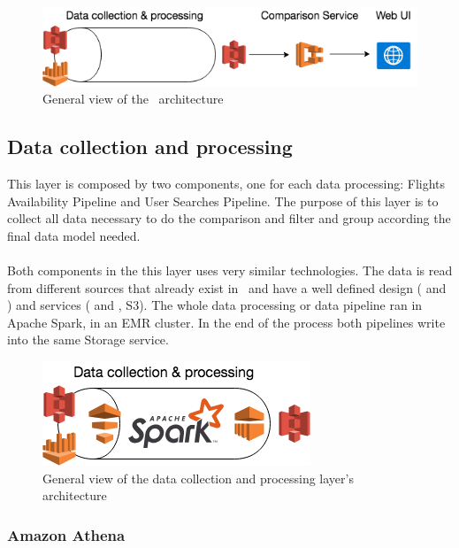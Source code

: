 \begin{figure}[H]
\centering
\includegraphics[scale=0.7]{diagrams/architecture01.png}
\caption{General view of the \thesis\ architecture}
\end{figure}

\subsection{Data collection and processing}

This layer is composed by two components, one for each data processing: Flights Availability Pipeline and User Searches Pipeline. The purpose of this layer is to collect all data necessary to do the comparison and filter and group according the final data model needed.
\\\\
Both components in the this layer uses very similar technologies. The data is read from different sources that already exist in \company\ and have a well defined design ( and ) and services ( and , S3). The whole data processing or data pipeline ran in Apache Spark, in an EMR cluster. In the end of the process both pipelines write into the same Storage service.

\begin{figure}[H]
\centering
\includegraphics[scale=0.7]{diagrams/architecture-data.png}
\caption{General view of the data collection and processing layer's architecture}
\end{figure}

\subsubsection{Amazon Athena} \label{athena}

